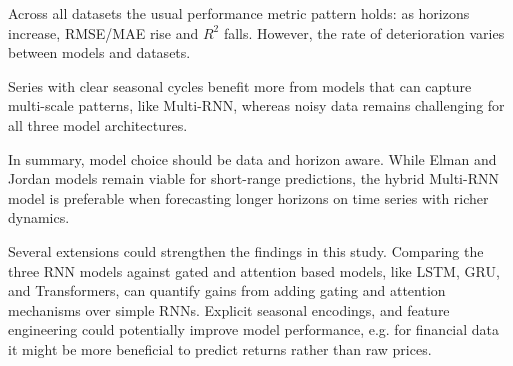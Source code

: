 \documentclass[conference]{IEEEtran}
\begin{document}
Across all datasets the usual performance metric pattern holds: as horizons increase, RMSE/MAE rise and $R^2$ falls. However, the rate of deterioration varies between models and datasets.

Series with clear seasonal cycles benefit more from models that can capture multi-scale patterns, like Multi-RNN, whereas noisy data remains challenging for all three model architectures.

In summary, model choice should be data and horizon aware. While Elman and Jordan models remain viable for short-range predictions, the hybrid Multi-RNN model is preferable when forecasting longer horizons on time series with richer dynamics.

Several extensions could strengthen the findings in this study. Comparing the three RNN models against gated and attention based models, like LSTM, GRU, and Transformers, can quantify gains from adding gating and attention mechanisms over simple RNNs. Explicit seasonal encodings, and feature engineering could potentially improve model performance, e.g. for financial data it might be more beneficial to predict returns rather than raw prices. 



\vspace{12pt}
\end{document}
